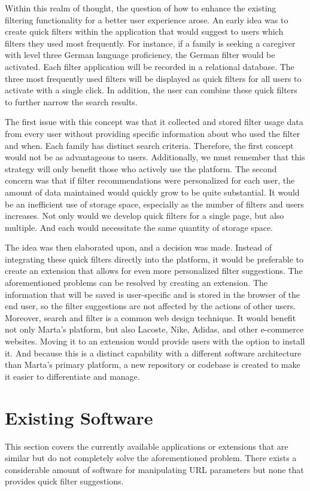 Within this realm of thought, the question of how to enhance the existing filtering functionality for a better user experience arose. An early idea was to create quick filters within the application that would suggest to users which filters they used most frequently. For instance, if a family is seeking a caregiver with level three German language proficiency, the German filter would be activated. Each filter application will be recorded in a relational database. The three most frequently used filters will be displayed as quick filters for all users to activate with a single click. In addition, the user can combine these quick filters to further narrow the search results.

The first issue with this concept was that it collected and stored filter usage data from every user without providing specific information about who used the filter and when. Each family has distinct search criteria. Therefore, the first concept would not be as advantageous to users. Additionally, we must remember that this strategy will only benefit those who actively use the platform. The second concern was that if filter recommendations were personalized for each user, the amount of data maintained would quickly grow to be quite substantial. It would be an inefficient use of storage space, especially as the number of filters and users increases. Not only would we develop quick filters for a single page, but also multiple. And each would necessitate the same quantity of storage space.

The idea was then elaborated upon, and a decision was made. Instead of integrating these quick filters directly into the platform, it would be preferable to create an extension that allows for even more personalized filter suggestions. The aforementioned problems can be resolved by creating an extension. The information that will be saved is user-specific and is stored in the browser of the end user, so the filter suggestions are not affected by the actions of other users. Moreover, search and filter is a common web design technique. It would benefit not only Marta's platform, but also Lacoste, Nike, Adidas, and other e-commerce websites. Moving it to an extension would provide users with the option to install it. And because this is a distinct capability with a different software architecture than Marta's primary platform, a new repository or codebase is created to make it easier to differentiate and manage.

\section{Existing Software}
This section covers the currently available applications or extensions that are similar but do not completely solve the aforementioned problem. There exists a considerable amount of software for manipulating URL parameters but none that provides quick filter suggestions.

